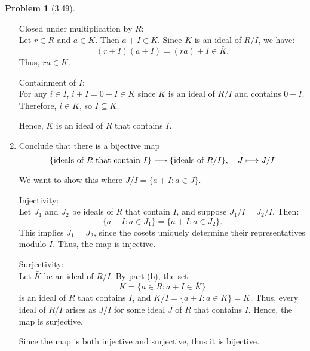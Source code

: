 \documentclass[12pt]{article}
\theoremstyle{definition}
\newtheorem{problem}{Problem}
\begin{document}
\begin{problem}[3.49]
\begin{enumerate}[label=(\alph*)]
\begin{solution}
                    Closed under multiplication by $R$:\\
                    Let $r \in R$ and $a \in K$. Then $a + I \in \bar{K}$. Since $\bar{K}$ is an ideal of $R/I$, we have:
                    \[
                    (r + I)(a + I) = (ra) + I \in \bar{K}.
                    \]
                    Thus, $ra \in K$.
                    
                    Containment of $I$:\\
                    For any $i \in I$, $i + I = 0 + I \in \bar{K}$ since $\bar{K}$ is an ideal of $R/I$ and contains $0 + I$. Therefore, $i \in K$, so $I \subseteq K$.
                    
                    Hence, $K$ is an ideal of $R$ that contains $I$.                    
                \end{solution}
        \item Conclude that there is a bijective map
                \[
                \{\text{ideals of $R$ that contain $I$}\} \longrightarrow \{\text{ideals of $R/I$}\}, \hspace{10px} J \longmapsto J/I
                \]
                \begin{solution}
                    We want to show this where $J/I = \{a + I : a \in J\}$.
                    
                    Injectivity:\\
                    Let $J_1$ and $J_2$ be ideals of $R$ that contain $I$, and suppose $J_1/I = J_2/I$. Then:
                    \[
                    \{a + I : a \in J_1\} = \{a + I : a \in J_2\}.
                    \]
                    This implies $J_1 = J_2$, since the cosets uniquely determine their representatives modulo $I$. Thus, the map is injective.
                    
                    Surjectivity:\\
                    Let $\bar{K}$ be an ideal of $R/I$. By part (b), the set:
                    \[
                    K = \{a \in R : a + I \in \bar{K}\}
                    \]
                    is an ideal of $R$ that contains $I$, and $K/I = \{a + I : a \in K\} = \bar{K}$. Thus, every ideal of $R/I$ arises as $J/I$ for some ideal $J$ of $R$ that contains $I$. Hence, the map is surjective.
                    
                    Since the map is both injective and surjective, thus it is bijective.                    
                \end{solution}
    \end{enumerate}
\end{problem}
\end{document}
